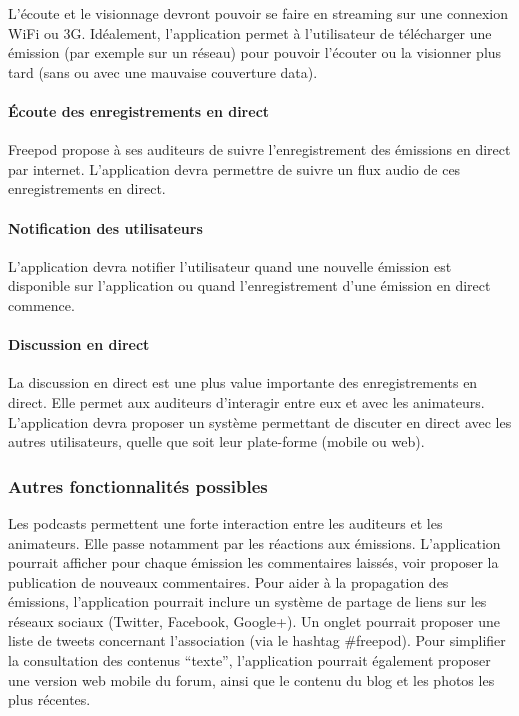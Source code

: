 \documentclass[11pt, french]{report}
\begin{document}
L’écoute et le visionnage devront pouvoir se faire en streaming sur une connexion WiFi ou 3G. Idéalement, l’application permet à l’utilisateur de télécharger une émission (par exemple sur un réseau) pour pouvoir l’écouter ou la visionner plus tard (sans ou avec une mauvaise couverture data).

\paragraph{Écoute des enregistrements en direct}

Freepod propose à ses auditeurs de suivre l’enregistrement des émissions en direct par internet. L’application devra permettre de suivre un flux audio de ces enregistrements en direct.

\paragraph{Notification des utilisateurs}

L’application devra notifier l’utilisateur quand une nouvelle émission est disponible sur l’application ou quand l’enregistrement d’une émission en direct commence.

\paragraph{Discussion en direct}

La discussion en direct est une plus value importante des enregistrements en direct. Elle permet aux auditeurs d'interagir entre eux et avec les animateurs. L’application devra proposer un système permettant de discuter en direct avec les autres utilisateurs, quelle que soit leur plate-forme (mobile ou web).

\subsubsection{Autres fonctionnalités possibles}

Les podcasts permettent une forte interaction entre les auditeurs et les animateurs. Elle passe notamment par les réactions aux émissions. L’application pourrait afficher pour chaque émission les commentaires laissés, voir proposer la publication de nouveaux commentaires.
Pour aider à la propagation des émissions, l’application pourrait inclure un système de partage de liens sur les réseaux sociaux (Twitter, Facebook, Google+).
Un onglet pourrait proposer une liste de tweets concernant l’association (via le hashtag #freepod).
Pour simplifier la consultation des contenus “texte”, l’application pourrait également proposer une version web mobile du forum, ainsi que le contenu du blog et les photos les plus récentes.
\end{document}

